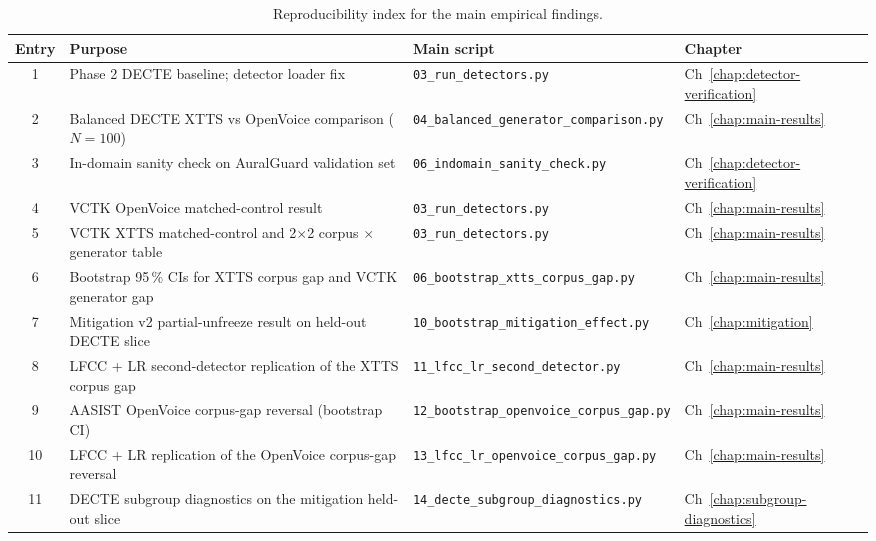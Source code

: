 \begin{table}[t]
\centering
\caption{Reproducibility index for the main empirical findings.}
\label{tab:appendix-reproducibility-index}
\scriptsize
\setlength{\tabcolsep}{4pt}
\begin{tabularx}{\linewidth}{@{}c X l l@{}}
\toprule
\textbf{Entry} & \textbf{Purpose} & \textbf{Main script} & \textbf{Chapter} \\
\midrule
1  & Phase 2 DECTE baseline; detector loader fix                    & \texttt{03\_run\_detectors.py}                & Ch~\ref{chap:detector-verification} \\
2  & Balanced DECTE XTTS vs OpenVoice comparison ($N = 100$)        & \texttt{04\_balanced\_generator\_comparison.py} & Ch~\ref{chap:main-results} \\
3  & In-domain sanity check on AuralGuard validation set            & \texttt{06\_indomain\_sanity\_check.py}       & Ch~\ref{chap:detector-verification} \\
4  & VCTK OpenVoice matched-control result                          & \texttt{03\_run\_detectors.py}                & Ch~\ref{chap:main-results} \\
5  & VCTK XTTS matched-control and 2$\times$2 corpus $\times$ generator table & \texttt{03\_run\_detectors.py}                & Ch~\ref{chap:main-results} \\
6  & Bootstrap 95\,\% CIs for XTTS corpus gap and VCTK generator gap & \texttt{06\_bootstrap\_xtts\_corpus\_gap.py}   & Ch~\ref{chap:main-results} \\
7  & Mitigation v2 partial-unfreeze result on held-out DECTE slice  & \texttt{10\_bootstrap\_mitigation\_effect.py}  & Ch~\ref{chap:mitigation} \\
8  & LFCC + LR second-detector replication of the XTTS corpus gap   & \texttt{11\_lfcc\_lr\_second\_detector.py}     & Ch~\ref{chap:main-results} \\
9  & AASIST OpenVoice corpus-gap reversal (bootstrap CI)            & \texttt{12\_bootstrap\_openvoice\_corpus\_gap.py} & Ch~\ref{chap:main-results} \\
10 & LFCC + LR replication of the OpenVoice corpus-gap reversal     & \texttt{13\_lfcc\_lr\_openvoice\_corpus\_gap.py} & Ch~\ref{chap:main-results} \\
11 & DECTE subgroup diagnostics on the mitigation held-out slice    & \texttt{14\_decte\_subgroup\_diagnostics.py}   & Ch~\ref{chap:subgroup-diagnostics} \\
\bottomrule
\end{tabularx}
\end{table}

